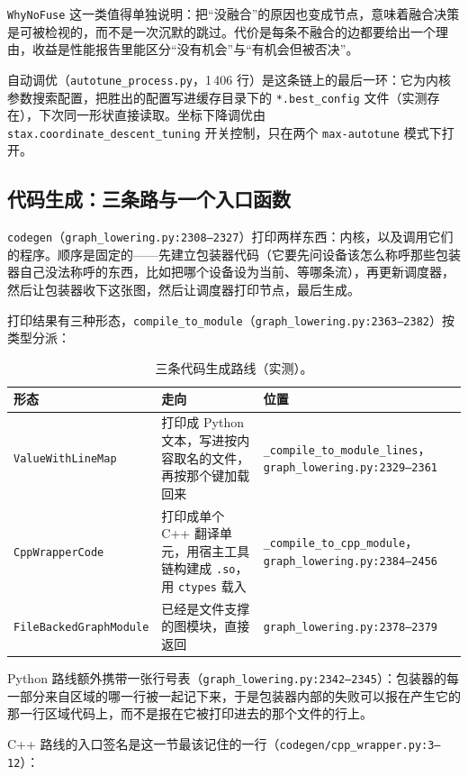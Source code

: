 \texttt{WhyNoFuse} 这一类值得单独说明：把“没融合”的原因也变成节点，意味着融合决策是可被检视的，而不是一次沉默的跳过。代价是每条不融合的边都要给出一个理由，收益是性能报告里能区分“没有机会”与“有机会但被否决”。

自动调优（\texttt{autotune\_process.py}，1\,406 行）是这条链上的最后一环：它为内核参数搜索配置，把胜出的配置写进缓存目录下的 \texttt{*.best\_config} 文件（实测存在），下次同一形状直接读取。坐标下降调优由 \texttt{stax.coordinate\_descent\_tuning} 开关控制，只在两个 \texttt{max-autotune} 模式下打开。

\subsection{代码生成：三条路与一个入口函数}

\texttt{codegen}（\texttt{graph\_lowering.py:2308--2327}）打印两样东西：内核，以及调用它们的程序。顺序是固定的——先建立包装器代码（它要先问设备该怎么称呼那些包装器自己没法称呼的东西，比如把哪个设备设为当前、等哪条流），再更新调度器，然后让包装器收下这张图，然后让调度器打印节点，最后生成。

打印结果有三种形态，\texttt{compile\_to\_module}（\texttt{graph\_lowering.py:2363--2382}）按类型分派：

\begin{table}[H]
\centering
\caption{三条代码生成路线（实测）。}
\label{tab:be:routes}
\small
\begin{tabular}{lll}
\toprule
形态 & 走向 & 位置 \\
\midrule
\texttt{ValueWithLineMap} & 打印成 Python 文本，写进按内容取名的文件，再按那个键加载回来 & \texttt{\_compile\_to\_module\_lines}，\texttt{graph\_lowering.py:2329--2361} \\
\texttt{CppWrapperCode} & 打印成单个 C++ 翻译单元，用宿主工具链构建成 \texttt{.so}，用 \texttt{ctypes} 载入 & \texttt{\_compile\_to\_cpp\_module}，\texttt{graph\_lowering.py:2384--2456} \\
\texttt{FileBackedGraphModule} & 已经是文件支撑的图模块，直接返回 & \texttt{graph\_lowering.py:2378--2379} \\
\bottomrule
\end{tabular}
\end{table}

Python 路线额外携带一张行号表（\texttt{graph\_lowering.py:2342--2345}）：包装器的每一部分来自区域的哪一行被一起记下来，于是包装器内部的失败可以报在产生它的那一行区域代码上，而不是报在它被打印进去的那个文件的行上。

C++ 路线的入口签名是这一节最该记住的一行（\texttt{codegen/cpp\_wrapper.py:3--12}）：

